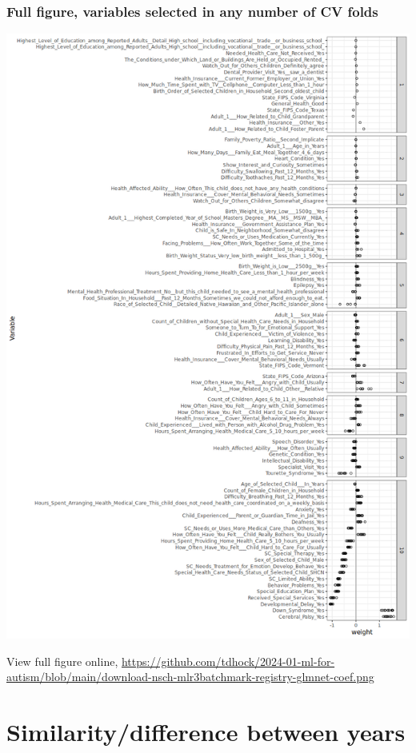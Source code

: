 \documentclass{beamer}
\begin{document}
\begin{frame}
  \frametitle{Full figure, variables selected in any number of CV folds}
  \includegraphics[height=0.7\textheight]{download-nsch-mlr3batchmark-registry-glmnet-coef.png}

  View full figure online, \url{https://github.com/tdhock/2024-01-ml-for-autism/blob/main/download-nsch-mlr3batchmark-registry-glmnet-coef.png}
\end{frame}

\section{Similarity/difference between years}
\end{document}
